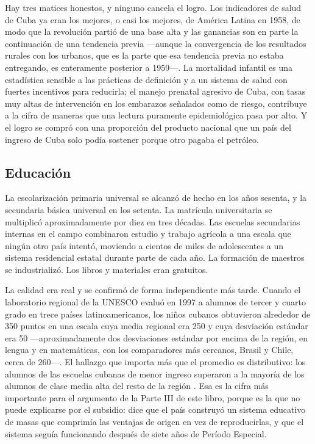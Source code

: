 Hay tres matices honestos, y ninguno cancela el logro. Los indicadores de salud
de Cuba ya eran los mejores, o casi los mejores, de América Latina en 1958, de
modo que la revolución partió de una base alta y las ganancias son en parte la
continuación de una tendencia previa ---aunque la convergencia de los resultados
rurales con los urbanos, que es la parte que esa tendencia previa no estaba
entregando, es enteramente posterior a 1959---. La mortalidad infantil es una
estadística sensible a las prácticas de definición y a un sistema de salud con
fuertes incentivos para reducirla; el manejo prenatal agresivo de Cuba, con tasas
muy altas de intervención en los embarazos señalados como de riesgo, contribuye a
la cifra de maneras que una lectura puramente epidemiológica pasa por alto. Y el
logro se compró con una proporción del producto nacional que un país del ingreso
de Cuba solo podía sostener porque otro pagaba el petróleo.

\subsection{Educación}

La escolarización primaria universal se alcanzó de hecho en los años sesenta, y
la secundaria básica universal en los setenta. La matrícula universitaria se
multiplicó aproximadamente por diez en tres décadas. Las escuelas secundarias
internas en el campo combinaron estudio y trabajo agrícola a una escala que
ningún otro país intentó, moviendo a cientos de miles de adolescentes a un
sistema residencial estatal durante parte de cada año. La formación de maestros
se industrializó. Los libros y materiales eran gratuitos.

La calidad era real y se confirmó de forma independiente más tarde. Cuando el
laboratorio regional de la UNESCO evaluó en 1997 a alumnos de tercer y cuarto
grado en trece países latinoamericanos, los niños cubanos obtuvieron alrededor de
350 puntos en una escala cuya media regional era 250 y cuya desviación estándar
era 50 ---aproximadamente dos desviaciones estándar por encima de la región, en
lengua y en matemáticas, con los comparadores más cercanos, Brasil y Chile, cerca
de 260---. El hallazgo que importa más que el promedio es distributivo: los
alumnos de las escuelas cubanas de menor ingreso superaron a la mayoría de los
alumnos de clase media alta del resto de la región \citep{carnoy2007}. Esa es la
cifra más importante para el argumento de la Parte III de este libro, porque es
la que no puede explicarse por el subsidio: dice que el país construyó un sistema
educativo de masas que comprimía las ventajas de origen en vez de reproducirlas,
y que el sistema seguía funcionando después de siete años de Período Especial.


